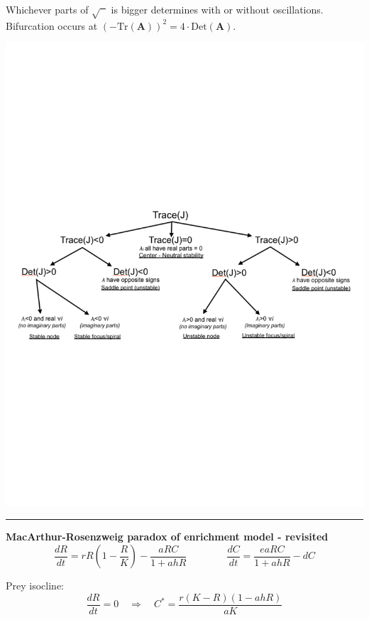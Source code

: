 \documentclass{article}
\newcommand{\ind}{\-\hspace{1cm}}
\begin{document}
\ind Whichever parts of $\sqrt{\phantom{x}}$ is bigger determines with or without oscillations.\\
\ind Bifurcation occurs at $(-\text{Tr}(\textbf{A}))^2 = 4\cdot \text{Det}(\textbf{A})$.\\
\begin{center}
 	\includegraphics[width=16cm]{figs/Classify.pdf}
\end{center}
 
\rule[0.5ex]{\linewidth}{1pt}
\pagebreak

\textbf{MacArthur-Rosenzweig paradox of enrichment model - revisited}
\begin{equation*}
	\frac{dR}{dt}=rR\left( 1-\frac{R}{K}\right) - \frac{aRC}{1+ahR} \qquad \qquad
	\frac{dC}{dt}=\frac{eaRC}{1+ahR} - dC
\end{equation*}

Prey isocline:
\begin{equation*}
	\frac{dR}{dt}=0 \quad \Rightarrow \quad C^*= \frac{r(K-R)(1-ahR)}{aK}
\end{equation*}
\end{document}
